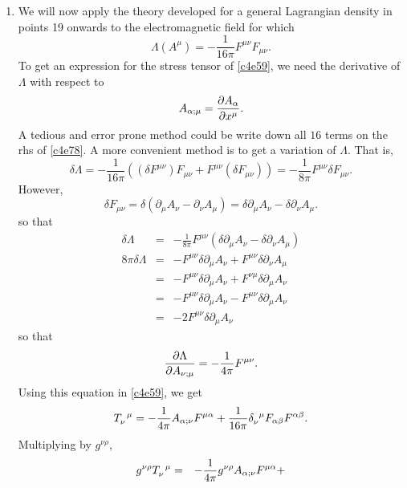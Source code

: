 \begin{enumerate}
\item We will now apply the theory developed for a general Lagrangian density
in points 19 onwards to the electromagnetic field for which
\begin{equation}\label{c4e76}
\Lambda(A^\mu) = -\frac{1}{16\pi}F^{\mu\nu}F_{\mu\nu}.
\end{equation}
To get an expression for the stress tensor of \eqref{c4e59}, we need the 
derivative of $\Lambda$ with respect to 
\[
A_{\alpha; \mu} = \frac{\partial{A_\alpha}}{\partial{x^\mu}}.
\]
A tedious and error prone method could be write down all $16$ terms on the rhs of
\eqref{c4e78}. A more convenient method is to get a variation of $\Lambda$. That is,
\begin{equation}\label{c4e77}
\delta\Lambda = -\frac{1}{16\pi}\left((\delta F^{\mu\nu})F_{\mu\nu} + 
F^{\mu\nu}(\delta F_{\mu\nu})\right) = -\frac{1}{8\pi}F^{\mu\nu}\delta F_{\mu\nu}.
\end{equation}
However,
\begin{equation}\label{c4e78}
\delta F_{\mu\nu} = \delta(\partial_\mu A_\nu - \partial_\nu A_\mu)
= \delta\partial_\mu A_\nu - \delta\partial_\nu A_\mu.
\end{equation}
so that
\begin{eqnarray}
\delta\Lambda &=& -\frac{1}{8\pi}F^{\mu\nu}(\delta\partial_\mu A_\nu - \delta\partial_\nu A_\mu) \nonumber \\
8\pi\delta\Lambda &=& -F^{\mu\nu}\delta\partial_\mu A_\nu + F^{\mu\nu}\delta\partial_\nu A_\mu \nonumber \\
 &=& -F^{\mu\nu}\delta\partial_\mu A_\nu + F^{\nu\mu}\delta\partial_\mu A_\nu \nonumber \\
 &=& -F^{\mu\nu}\delta\partial_\mu A_\nu - F^{\mu\nu}\delta\partial_\mu A_\nu \nonumber \\
 &=& -2F^{\mu\nu}\delta\partial_\mu A_\nu \label{c4e79}
\end{eqnarray}
so that
\begin{equation}\label{c4e80}
\frac{\partial{\Lambda}}{\partial{A_{\nu;\mu}}} = -\frac{1}{4\pi}F^{\mu\nu}.
\end{equation}
Using this equation in \eqref{c4e59}, we get
\begin{equation}\label{c4e81}
\tensor{T}{_\nu^\mu} = -\frac{1}{4\pi}A_{\alpha;\nu}F^{\mu\alpha} +
\frac{1}{16\pi}\tensor{\delta}{_\nu^\mu} F_{\alpha\beta}F^{\alpha\beta}.
\end{equation}
Multiplying by $g^{\nu\rho}$,
\begin{eqnarray}
g^{\nu\rho}\tensor{T}{_\nu^\mu} &=& -\frac{1}{4\pi}g^{\nu\rho}A_{\alpha;\nu}F^{\mu\alpha} +

\end{eqnarray}
\end{enumerate}
